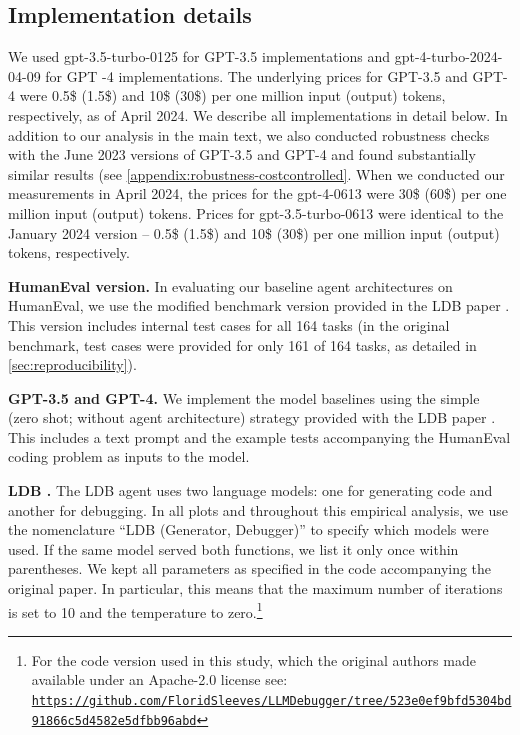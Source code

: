 \documentclass{article}
\begin{document}
\subsection{Implementation details}
\label{appendix:cost-controlled-implementation}

We used gpt-3.5-turbo-0125 for GPT-3.5 implementations and gpt-4-turbo-2024-04-09 for
GPT -4 implementations. The underlying prices for GPT-3.5 and GPT-4 were 0.5\$ (1.5\$) and 10\$ (30\$) per one million input (output) tokens, respectively, as of April 2024. We describe all implementations in detail below. In addition to our analysis in the main text, we also conducted robustness checks with the June 2023 versions of GPT-3.5 and GPT-4 and found substantially similar results (see \cref{appendix:robustness-costcontrolled}. When we conducted our measurements in April 2024, the prices for the gpt-4-0613 were 30\$ (60\$) per one million input (output) tokens. Prices for gpt-3.5-turbo-0613 were identical to the January 2024 version -- 0.5\$ (1.5\$) and 10\$ (30\$) per one million input (output) tokens, respectively.

\textbf{HumanEval version.} In evaluating our baseline agent architectures on HumanEval, we use the modified benchmark version provided in the LDB paper \citep{zhong_ldb_2024}. This version includes internal test cases for all 164 tasks (in the original benchmark, test cases were provided for only 161 of 164 tasks, as detailed in \cref{sec:reproducibility}). 

\textbf{GPT-3.5 and GPT-4.} We implement the model baselines using the simple (zero shot; without agent architecture) strategy provided with the LDB paper \citep{zhong_ldb_2024}. This includes a text prompt and the example tests accompanying the HumanEval coding problem as inputs to the model.

\textbf{LDB \citep{zhong_ldb_2024}.} The LDB agent uses two language models: one for generating code and another for debugging. In all plots and throughout this empirical analysis, we use the nomenclature “LDB (Generator, Debugger)” to specify which models were used. If the same model served both functions, we list it only once within parentheses. We kept all parameters as specified in the code accompanying the original paper. In particular, this means that the maximum number of iterations is set to 10 and the temperature to zero.\footnote{For the code version used in this study, which the original authors made available under an Apache-2.0 license see: \texttt{\url{https://github.com/FloridSleeves/LLMDebugger/tree/523e0ef9bfd5304bd91866c5d4582e5dfbb96abd}}}
\end{document}
